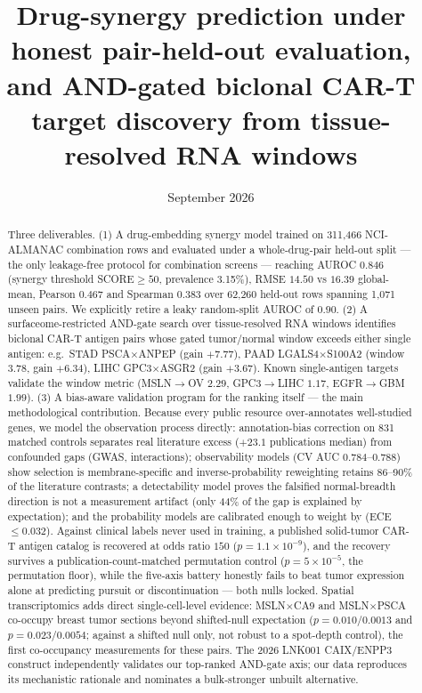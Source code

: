 \documentclass[11pt]{article}
\title{Drug-synergy prediction under honest pair-held-out evaluation, and AND-gated biclonal CAR-T target discovery from tissue-resolved RNA windows}
\author{}
\date{September 2026}
\begin{document}
\maketitle
\begin{abstract}
Three deliverables. (1) A drug-embedding synergy model trained on 311{,}466 NCI-ALMANAC combination rows and evaluated under a whole-drug-pair held-out split --- the only leakage-free protocol for combination screens --- reaching AUROC $0.846$ (synergy threshold SCORE$\ge50$, prevalence 3.15\%), RMSE $14.50$ vs $16.39$ global-mean, Pearson $0.467$ and Spearman $0.383$ over 62{,}260 held-out rows spanning 1{,}071 unseen pairs. We explicitly retire a leaky random-split AUROC of $0.90$. (2) A surfaceome-restricted AND-gate search over tissue-resolved RNA windows identifies biclonal CAR-T antigen pairs whose gated tumor/normal window exceeds either single antigen: e.g.\ STAD PSCA$\times$ANPEP (gain $+7.77$), PAAD LGALS4$\times$S100A2 (window $3.78$, gain $+6.34$), LIHC GPC3$\times$ASGR2 (gain $+3.67$). Known single-antigen targets validate the window metric (MSLN$\to$OV $2.29$, GPC3$\to$LIHC $1.17$, EGFR$\to$GBM $1.99$). (3) A bias-aware validation program for the ranking itself --- the main methodological contribution. Because every public resource over-annotates well-studied genes, we model the observation process directly: annotation-bias correction on 831 matched controls separates real literature excess ($+23.1$ publications median) from confounded gaps (GWAS, interactions); observability models (CV AUC $0.784$--$0.788$) show selection is membrane-specific and inverse-probability reweighting retains 86--90\% of the literature contrasts; a detectability model proves the falsified normal-breadth direction is not a measurement artifact (only 44\% of the gap is explained by expectation); and the probability models are calibrated enough to weight by (ECE $\le 0.032$). Against clinical labels never used in training, a published solid-tumor CAR-T antigen catalog is recovered at odds ratio $150$ ($p=1.1\times10^{-9}$), and the recovery survives a publication-count-matched permutation control ($p=5\times10^{-5}$, the permutation floor), while the five-axis battery honestly fails to beat tumor expression alone at predicting pursuit or discontinuation --- both nulls locked. Spatial transcriptomics adds direct single-cell-level evidence: MSLN$\times$CA9 and MSLN$\times$PSCA co-occupy breast tumor sections beyond shifted-null expectation ($p=0.010$/$0.0013$ and $p=0.023$/$0.0054$; against a shifted null only, not robust to a spot-depth control), the first co-occupancy measurements for these pairs. The 2026 LNK001 CAIX/ENPP3 construct independently validates our top-ranked AND-gate axis; our data reproduces its mechanistic rationale and nominates a bulk-stronger unbuilt alternative.
\end{abstract}
\tableofcontents\newpage
\end{document}
